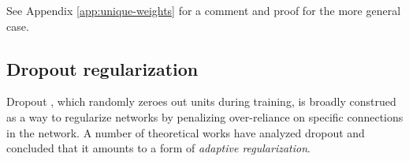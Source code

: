 \documentclass[10pt]{article}
\begin{document}

See Appendix \ref{app:unique-weights} for a comment and proof for the more general case.




\subsection{Dropout regularization}
Dropout \citep{srivastava_dropout_2014}, which randomly zeroes out units during training, is broadly construed as a way to regularize networks by penalizing over-reliance on specific connections in the network. A number of theoretical works have analyzed dropout and concluded that it amounts to a form of \textit{adaptive regularization}.

\cite{wei_implicit_2020}



\end{document}
